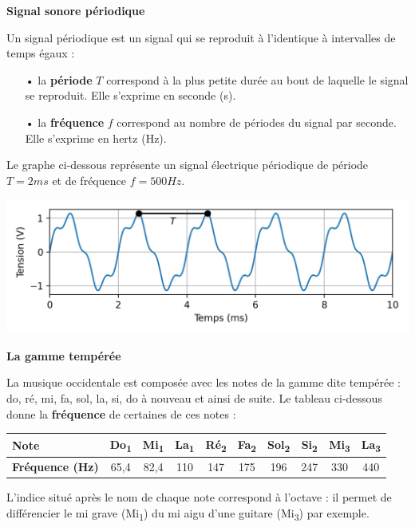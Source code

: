 \documentclass[12pt,a4paper]{article}
\begin{document}
\begin{doc}
\label{doc:periodic_signal}
\textbf{Signal sonore périodique}

Un signal périodique est un signal qui se reproduit à l'identique à intervalles de temps égaux :
\begin{itemize}
\item[•] la \textbf{période} $T$ correspond à la plus petite durée au bout de laquelle le signal se reproduit.
Elle s'exprime en seconde (s).
\item[•] la \textbf{fréquence} $f$ correspond au nombre de périodes du signal par seconde.
Elle s'exprime en hertz (Hz).
\end{itemize}

Le graphe ci-dessous représente un signal électrique périodique de période $T=\unit{2}{ms}$ et de fréquence $f=\unit{500}{Hz}$.

\begin{center}
\includegraphics[scale=1]{images/periodic_signal.png}
\end{center}
\end{doc}

\begin{doc}
\textbf{La gamme tempérée}

La musique occidentale est composée avec les notes de la gamme dite tempérée : do, ré, mi, fa, sol, la, si, do à nouveau et ainsi de suite.
Le tableau ci-dessous donne la \textbf{fréquence} de certaines de ces notes :
\begin{center}
\begin{tabular}{l|c|c|c|c|c|c|c|c|c}
\textbf{Note}						& \textbf{Do\textsubscript{1}} & \textbf{Mi\textsubscript{1}} & \textbf{La\textsubscript{1}} & \textbf{Ré\textsubscript{2}} & \textbf{Fa\textsubscript{2}} & \textbf{Sol\textsubscript{2}} & \textbf{Si\textsubscript{2}} & \textbf{Mi\textsubscript{3}} & \textbf{La\textsubscript{3}} \\
\hline
\textbf{Fréquence (Hz)} 	& 65{,}4 & 82{,}4 & 110 & 147 & 175 & 196 & 247 & 330 & 440 \\
\end{tabular}
\end{center}
L'indice situé après le nom de chaque note correspond à l'octave : il permet de différencier le mi grave (Mi\textsubscript{1}) du mi aigu d'une guitare (Mi\textsubscript{3}) par exemple.
\end{doc}
\end{document}

